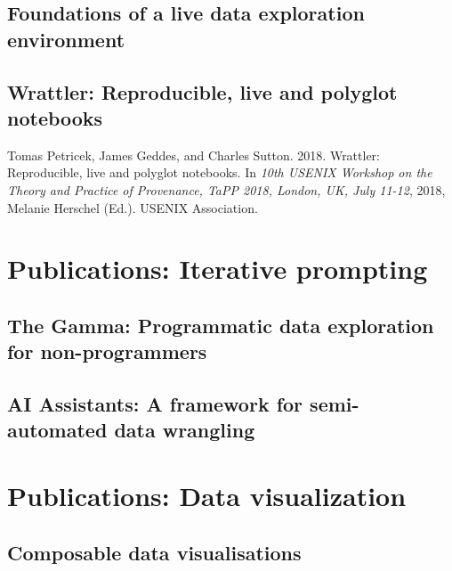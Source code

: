 \documentclass[fleqn,11pt]{report}
\theoremstyle{definition}
\begin{document}
\chapter{Foundations of a live data exploration environment}
\label{ch:foundations}


\chapter{Wrattler: Reproducible, live and polyglot notebooks}
\label{ch:wrattler}

Tomas Petricek, James Geddes, and Charles Sutton. 2018. Wrattler: Reproducible, live and
polyglot notebooks. In \emph{10th USENIX Workshop on the Theory and Practice of Provenance,
TaPP 2018, London, UK, July 11-12}, 2018, Melanie Herschel (Ed.). USENIX Association.


\part{Publications: Iterative prompting}
\label{part:iterative}

\chapter{The Gamma: Programmatic data exploration for non-programmers}
\label{ch:thegamma}


\chapter{AI Assistants: A framework for semi-automated data wrangling}
\label{ch:aia}


\part{Publications: Data visualization}
\label{part:visualization}

\chapter{Composable data visualisations}
\label{ch:compost}

\end{document}
